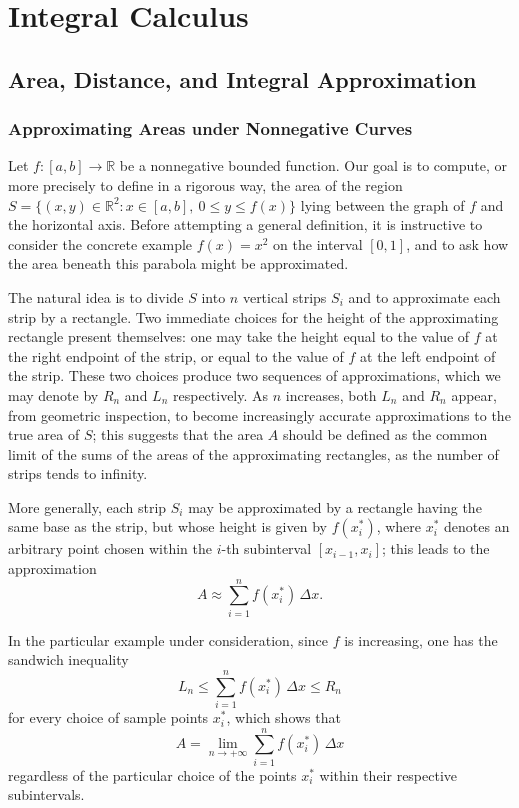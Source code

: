 \chapter{Integral Calculus}

\section{Area, Distance, and Integral Approximation}

\subsection{Approximating Areas under Nonnegative Curves}

Let $f : [a,b] \to \mathbb{R}$ be a nonnegative bounded function. Our goal is to compute, or more precisely to define in a rigorous way, the area of the region $S = \{ (x,y) \in \mathbb{R}^2 : x \in [a,b], \ 0 \leq y \leq f(x) \}$ lying between the graph of $f$ and the horizontal axis. Before attempting a general definition, it is instructive to consider the concrete example $f(x) = x^2$ on the interval $[0,1]$, and to ask how the area beneath this parabola might be approximated.

The natural idea is to divide $S$ into $n$ vertical strips $S_i$ and to approximate each strip by a rectangle. Two immediate choices for the height of the approximating rectangle present themselves: one may take the height equal to the value of $f$ at the right endpoint of the strip, or equal to the value of $f$ at the left endpoint of the strip. These two choices produce two sequences of approximations, which we may denote by $R_n$ and $L_n$ respectively. As $n$ increases, both $L_n$ and $R_n$ appear, from geometric inspection, to become increasingly accurate approximations to the true area of $S$; this suggests that the area $A$ should be defined as the common limit of the sums of the areas of the approximating rectangles, as the number of strips tends to infinity.

More generally, each strip $S_i$ may be approximated by a rectangle having the same base as the strip, but whose height is given by $f(x_i^*)$, where $x_i^*$ denotes an arbitrary point chosen within the $i$-th subinterval $[x_{i-1}, x_i]$; this leads to the approximation
\[
A \approx \sum_{i=1}^{n} f(x_i^*) \, \Delta x.
\]

In the particular example under consideration, since $f$ is increasing, one has the sandwich inequality \[
L_n \leq \sum_{i=1}^{n} f(x_i^*) \, \Delta x \leq R_n
\] for every choice of sample points $x_i^*$, which shows that \[
A = \lim_{n \to +\infty} \sum_{i=1}^{n} f(x_i^*) \, \Delta x
\] regardless of the particular choice of the points $x_i^*$ within their respective subintervals.


